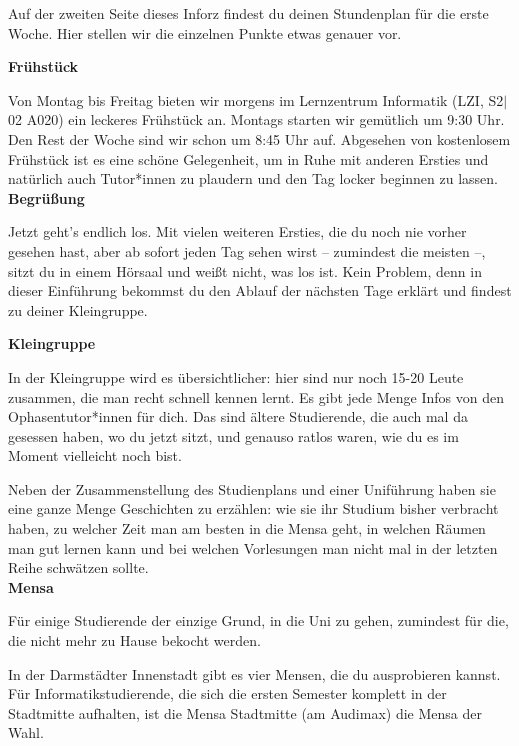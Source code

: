 {Auf der zweiten Seite dieses Inforz findest du deinen Stundenplan für die erste Woche. Hier stellen wir die einzelnen Punkte etwas genauer vor.}
{\textbf{Frühstück}

    Von Montag bis Freitag bieten wir morgens im Lernzentrum Informatik (LZI, S2$|$02 A020) ein leckeres Frühstück an. Montags starten wir gemütlich um 9:30 Uhr. Den Rest der Woche sind wir schon um 8:45 Uhr auf.  Abgesehen von kostenlosem Frühstück ist es eine schöne Gelegenheit, um in Ruhe mit anderen Ersties und natürlich auch Tutor*innen zu plaudern und den Tag locker beginnen zu lassen.\\

    \noindent\textbf{Begrüßung}

    Jetzt geht's endlich los. Mit vielen weiteren Ersties, die du noch nie vorher gesehen hast, aber ab sofort jeden Tag sehen wirst – zumindest die meisten –, sitzt du in einem Hörsaal und weißt nicht, was los ist. Kein Problem, denn in dieser Einführung bekommst du den Ablauf der nächsten Tage erklärt und findest zu deiner Kleingruppe.


    \noindent\textbf{Kleingruppe}

    In der Kleingruppe wird es übersichtlicher: hier sind nur noch 15-20 Leute zusammen, die man recht schnell kennen lernt. Es gibt jede Menge Infos von den Ophasentutor*innen für dich. Das sind ältere Studierende, die auch mal da gesessen haben, wo du jetzt sitzt, und genauso ratlos waren, wie du es im Moment vielleicht noch bist.

    Neben der Zusammenstellung des Studienplans und einer Uniführung haben sie eine ganze Menge Geschichten zu erzählen: wie sie ihr Studium bisher verbracht haben, zu welcher Zeit man am besten in die Mensa geht, in welchen Räumen man gut lernen kann und bei welchen Vorlesungen man nicht mal in der letzten Reihe schwätzen sollte.\\

    \noindent\textbf{Mensa}

    Für einige Studierende der einzige Grund, in die Uni zu gehen, zumindest für die, die nicht mehr zu Hause bekocht werden.

    In der Darmstädter Innenstadt gibt es vier Mensen, die du ausprobieren kannst. Für Informatikstudierende, die sich die ersten Semester komplett in der Stadtmitte aufhalten, ist die Mensa Stadtmitte (am Audimax) die Mensa der Wahl.

}
